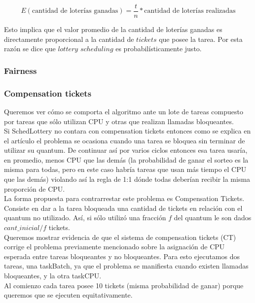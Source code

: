 \[
	E(\text{cantidad de loter\'ias ganadas}) = \frac{t}{n}*\text{cantidad de loter\'ias realizadas}
\]

Esto implica que el valor promedio de la cantidad de loter\'ias ganadas es directamente proporcional a la cantidad de $tickets$ que posee la tarea. Por esta raz\'on se dice que $lottery$ $scheduling$ es probabil\'isticamente justo.

\subsubsection{Fairness}

\subsubsection{Compensation tickets}

Queremos ver cómo se comporta el algoritmo ante un lote de tareas compuesto por
tareas que sólo utilizan CPU y otras que realizan llamadas bloqueantes.\\

Si SchedLottery no contara con compensation tickets entonces como se explica en el artículo \cite[Sec. 3.4]{SchedLottery} el problema se 
ocasiona cuando una tarea se bloquea sin terminar de utilizar su quantum.
De continuar así por varios ciclos entonces esa tarea usaría, en promedio, menos CPU que las demás
(la probabilidad de ganar el sorteo es la misma para todas, pero en este caso habría tareas que
usan más tiempo el CPU que las demás)
violando así la regla de 1:1 dónde todas deberían recibir la misma proporción de CPU.\\

La forma propuesta para contrarrestar este problema es Compensation Tickets. 
Consiste en dar a la tarea bloqueada una cantidad de tickets en relación con el quantum no utilizado.
Así, si sólo utilizó una fracción $f$ del quantum le son dados $cant\_inicial/f$ tickets.\\

Queremos mostrar evidencia de que el sistema de compensation tickets (CT) corrige el problema
previamente mencionado sobre la asignación de CPU esperada entre tareas bloqueantes y no bloqueantes.
Para esto ejecutamos dos tareas, una taskBatch, ya que el problema se manifiesta cuando existen llamadas bloqueantes, y la otra taskCPU.\\

Al comienzo cada tarea posee 10 tickets (misma probabilidad de ganar) porque queremos que se ejecuten equitativamente.\\

